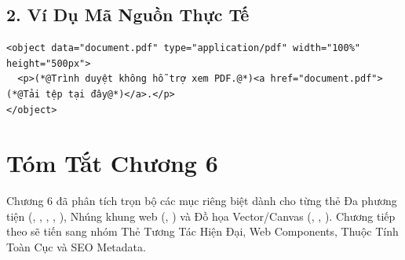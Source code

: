 \subsection{2. Ví Dụ Mã Nguồn Thực Tế}
\begin{lstlisting}[language=HTML5, caption={Ví dụ nhúng tệp PDF hiển thị trực tiếp}]
<object data="document.pdf" type="application/pdf" width="100%" height="500px">
  <p>(*@Trình duyệt không hỗ trợ xem PDF.@*)<a href="document.pdf">(*@Tải tệp tại đây@*)</a>.</p>
</object>
\end{lstlisting}

\section{Tóm Tắt Chương 6}
\begin{conceptBox}
Chương 6 đã phân tích trọn bộ các mục riêng biệt dành cho từng thẻ Đa phương tiện (, , , , ), Nhúng khung web (, ) và Đồ họa Vector/Canvas (, , ). Chương tiếp theo sẽ tiến sang nhóm Thẻ Tương Tác Hiện Đại, Web Components, Thuộc Tính Toàn Cục và SEO Metadata.
\end{conceptBox}

